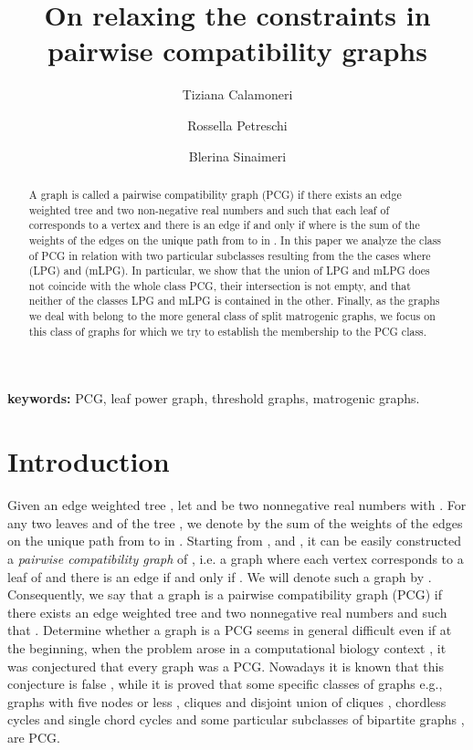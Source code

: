 \documentclass[dvipdfm]{llncs}
\title{On relaxing the constraints in pairwise compatibility graphs}
\author{Tiziana Calamoneri \and Rossella Petreschi \and Blerina Sinaimeri}
\begin{document}
\maketitle              


\begin{abstract}
A graph  is called a pairwise compatibility graph (PCG) if there exists an edge weighted tree  and two non-negative real numbers  and  such that each leaf  of  corresponds to a vertex  and there is an edge  if and only if  where  is the sum of the weights of the edges on the unique path from  to  in .  In this paper we analyze the class of PCG in relation with two particular subclasses resulting from the the cases where  (LPG) and  (mLPG). In particular, we show that the union of LPG and mLPG does not coincide with the whole class PCG, their intersection is not empty, and that neither of the classes LPG and mLPG is contained in the other.  Finally, as the graphs we deal with belong to the more general class of split matrogenic graphs,  we focus on this class of graphs for which we try to establish the membership to the PCG class. 



\end{abstract}

{\bf keywords:} PCG, leaf power graph, threshold graphs, matrogenic graphs.


\section{Introduction}

Given an edge weighted tree , let  and  be two nonnegative real numbers with . For any two leaves  and  of the tree , we denote by  the sum of the weights of the edges on the unique path from  to  in . Starting from ,  and , it can be easily constructed a \textsl{pairwise compatibility graph }of , i.e. a graph  where each vertex  corresponds to a leaf  of  and there is an edge  if and only if . We will denote such a graph  by . Consequently, we say that a graph  is a pairwise compatibility graph (PCG) if there exists an edge weighted tree  and two nonnegative real numbers   and  such that . Determine whether a graph  is a PCG seems in general difficult even if at the beginning, when the problem arose in a computational biology context \cite{Kal03}, it was conjectured that every graph was a PCG. Nowadays it is known that this conjecture is false \cite{YBR10}, while it is proved that some specific classes of graphs e.g., graphs with five nodes or less \cite{P02}, cliques and disjoint union of cliques \cite{B}, chordless cycles and single chord cycles \cite{YHR09} and some particular subclasses of bipartite graphs \cite{YBR10}, are PCG.
\end{document}
